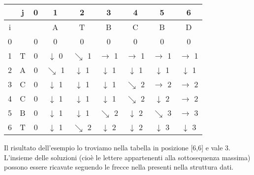 \documentclass[../cheatSheetAlgoritmi.tex]{subfiles}
\begin{document}
\begin{center}
	\renewcommand{\arraystretch}{1.2}
	\begin{tabular}{ |c|c|c|c|c|c|c|c|c| } 
		\hline
			&j &0 &1 &2 &3 &4 &5 &6\\
		\hline
			i & & &A &T &B &C &B &D\\
		\hline
			0 & &0 &0 &0 &0 &0 &0 &0\\
		\hline
			1 &T &0 & $\downarrow$ 0 & $\searrow$ 1 & $\rightarrow$ 1 & $\rightarrow$ 1 & $\rightarrow$ 1 & $\rightarrow$ 1\\
		\hline
			2 &A &0 & $\searrow$ 1 & $\downarrow$ 1 & $\downarrow$ 1 & $\downarrow$ 1 & $\downarrow$ 1 & $\downarrow$ 1\\
		\hline
			3 &C &0 & $\downarrow$ 1 & $\downarrow$ 1 & $\downarrow$ 1 & $\searrow$ 2 & $\rightarrow$ 2 & $\rightarrow$ 2\\
		\hline
			4 &C &0 & $\downarrow$ 1 & $\downarrow$ 1 & $\downarrow$ 1 & $\searrow$ 2 & $\downarrow$ 2 & $\rightarrow$ 2\\
		\hline
			5 &B &0 & $\downarrow$ 1 & $\downarrow$ 1 & $\searrow$ 2 & $\downarrow$ 2 & $\searrow$ 3 & $\rightarrow$ 3\\
		\hline
			6 &T &0 & $\downarrow$ 1 & $\searrow$ 2 & $\downarrow$ 2 & $\downarrow$ 2 & $\downarrow$ 3 & $\downarrow$ 3\\
			\hline
	\end{tabular}
\end{center}
Il risultato dell'esempio lo troviamo nella tabella in posizione [6,6] e vale 3. L'insieme delle soluzioni (cioè le lettere appartenenti alla sottosequenza massima) possono essere ricavate seguendo le frecce nella presenti nella struttura dati.

\bigskip
\end{document}
